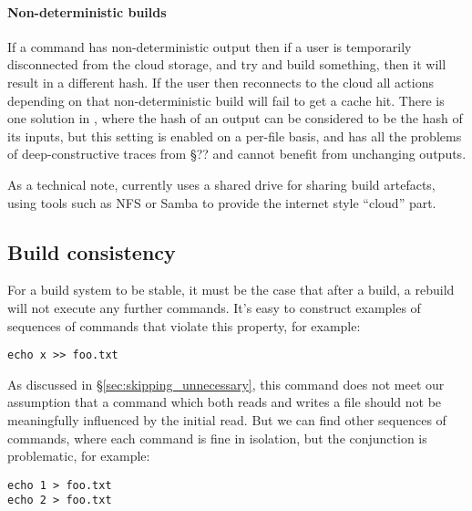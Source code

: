 \paragraph{Non-deterministic builds} If a command has non-deterministic output then if a user is temporarily disconnected from the cloud storage, and try and build something, then it will result in a different hash. If the user then reconnects to the cloud all actions depending on that non-deterministic build will fail to get a cache hit. There is one solution in \Rattle, where the hash of an output can be considered to be the hash of its inputs, but this setting is enabled on a per-file basis, and has all the problems of deep-constructive traces from \cite{build_systems_a_la_carte} \S?? and cannot benefit from unchanging outputs.

As a technical note, currently \Rattle uses a shared drive for sharing build artefacts, using tools such as NFS or Samba to provide the internet style ``cloud'' part.

\subsection{Build consistency}
\label{sec:hazards}

For a \Make build system to be stable, it must be the case that after a build, a rebuild will not execute any further commands. It's easy to construct examples of sequences of commands that violate this property, for example:

\begin{verbatim}
echo x >> foo.txt
\end{verbatim}



As discussed in \S\ref{sec:skipping_unnecessary}, this command does not meet our assumption that a command which both reads and writes a file should not be meaningfully influenced by the initial read. But we can find other sequences of commands, where each command is fine in isolation, but the conjunction is problematic, for example:

\begin{verbatim}
echo 1 > foo.txt
echo 2 > foo.txt
\end{verbatim}

